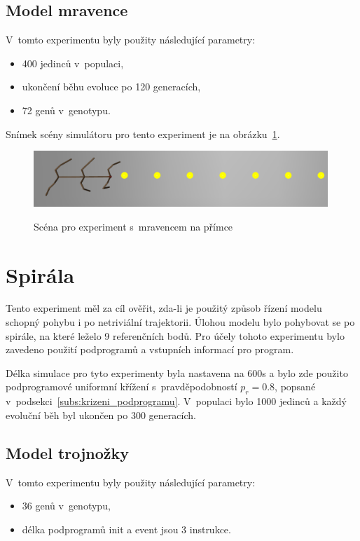 \subsection{Model mravence}
V~tomto experimentu byly použity následující parametry:
\begin{itemize}
    \item 400 jedinců v~populaci,
    \item ukončení běhu evoluce po 120 generacích,
    \item 72 genů v~genotypu.
\end{itemize}

Snímek scény simulátoru pro tento experiment je na obrázku~\ref{fig:mravenec_primka_zhora}.
\begin{figure}[h]
    \centering
    {\includegraphics[width=30em]{obrazky/mravenec_primka_zhora.png}}
    \caption{
    Scéna pro experiment s~mravencem na přímce
    }
    \label{fig:mravenec_primka_zhora}
\end{figure}





\section{Spirála}
\label{sec:experiment_spirala}
Tento experiment měl za cíl ověřit, zda-li je použitý způsob řízení modelu schopný pohybu i po netriviální trajektorii.
Úlohou modelu bylo pohybovat se po spirále, na které leželo 9 referenčních bodů.
Pro účely tohoto experimentu bylo zavedeno použití podprogramů a vstupních informací pro program.

Délka simulace pro tyto experimenty byla nastavena na 600s a bylo zde použito podprogramové uniformní křížení s~pravděpodobností $p_r = 0.8$, popsané v~podsekci~\ref{subs:krizeni_podprogramu}.
V~populaci bylo 1000 jedinců a každý evoluční běh byl ukončen po 300 generacích.

\subsection{Model trojnožky}
V~tomto experimentu byly použity následující parametry:
\begin{itemize}
    \item 36 genů v~genotypu,
    \item délka podprogramů init a event jsou 3 instrukce.
\end{itemize}

